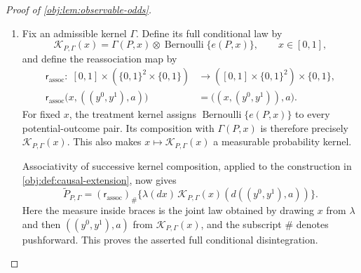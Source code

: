 \documentclass[11pt]{article}
\begin{document}
\begin{proof}[Proof of \cref{obj:lem:observable-odds}]
\begin{enumerate}
\item Fix an admissible kernel \(\Gamma\). Define its full conditional law by
\[
\mathcal K_{P,\Gamma}(x)
=\Gamma(P,x)\otimes\operatorname{Bernoulli}\{e(P,x)\},
\qquad x\in[0,1],
\]
and define the reassociation map by
\[
\begin{aligned}
\mathsf r_{\mathrm{assoc}}:\;
[0,1]\times(\{0,1\}^2\times\{0,1\})
&\longrightarrow([0,1]\times\{0,1\}^2)\times\{0,1\},\\
\mathsf r_{\mathrm{assoc}}\bigl(x,((y^0,y^1),a)\bigr)
&=\bigl((x,(y^0,y^1)),a\bigr).
\end{aligned}
\]
For fixed \(x\), the treatment kernel assigns
\(\operatorname{Bernoulli}\{e(P,x)\}\) to every potential-outcome pair. Its composition with \(\Gamma(P,x)\) is therefore precisely \(\mathcal K_{P,\Gamma}(x)\). This also makes \(x\mapsto\mathcal K_{P,\Gamma}(x)\) a measurable probability kernel.

Associativity of successive kernel composition, applied to the construction in \cref{obj:def:causal-extension}, now gives
\[
\widetilde P_{P,\Gamma}
=(\mathsf r_{\mathrm{assoc}})_\#
 \bigl\{\lambda(dx)\,
 \mathcal K_{P,\Gamma}(x)(d((y^0,y^1),a))\bigr\}.
\]
Here the measure inside braces is the joint law obtained by drawing \(x\) from \(\lambda\) and then \(((y^0,y^1),a)\) from \(\mathcal K_{P,\Gamma}(x)\), and the subscript \(\#\) denotes pushforward. This proves the asserted full conditional disintegration.


\end{enumerate}
\end{proof}
\end{document}
